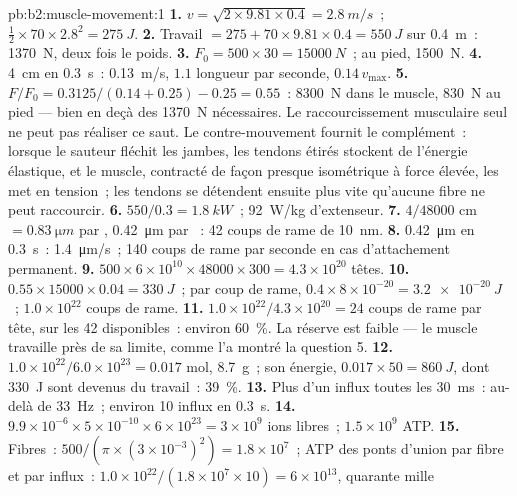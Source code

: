 \begin{solution}{pb:b2:muscle-movement:1}
\textbf{1.} $v = \sqrt{2\times 9.81\times 0.4} = \qty{2.8}{m/s}$~;
$\tfrac12\times 70\times 2.8^{2} = \qty{275}{J}$.
\textbf{2.} Travail $= 275 + 70\times 9.81\times 0.4 = \qty{550}{J}$ sur
\qty{0.4}{m}~: \qty{1370}{N}, deux fois le poids.
\textbf{3.} $F_0 = 500\times 30 = \qty{15000}{N}$~; au pied,
\qty{1500}{N}.
\textbf{4.} \qty{4}{cm} en \qty{0.3}{s}~: \qty{0.13}{m/s}, $1.1$ longueur
par seconde, $0.14\,v_{\max}$.
\textbf{5.} $F/F_0 = 0.3125/(0.14 + 0.25) - 0.25 = 0.55$~: \qty{8300}{N}
dans le muscle, \qty{830}{N} au pied --- bien en deçà des
\qty{1370}{N} nécessaires. Le raccourcissement musculaire seul ne peut
pas réaliser ce saut. Le contre-mouvement fournit le complément~: lorsque
le sauteur fléchit les jambes, les tendons étirés stockent de l'énergie
élastique, et le muscle, contracté de façon presque isométrique à force
élevée, les met en tension~; les tendons se détendent ensuite plus vite
qu'aucune fibre ne peut raccourcir.
\textbf{6.} $550/0.3 = \qty{1.8}{kW}$~; \qty{92}{W/kg} d'extenseur.
\textbf{7.} $4/\num{48000}$ cm $= \qty{0.83}{\micro m}$ par ,
\qty{0.42}{\micro m} par ~: 42 coups de rame de \qty{10}{nm}.
\textbf{8.} \qty{0.42}{\micro m} en \qty{0.3}{s}~: \qty{1.4}{\micro m/s}~;
140 coups de rame par seconde en cas d'attachement permanent.
\textbf{9.} $500\times 6\times 10^{10}\times \num{48000}\times 300 =
4.3\times 10^{20}$ têtes.
\textbf{10.} $0.55\times \num{15000}\times 0.04 = \qty{330}{J}$~; par
coup de rame, $0.4\times 8\times 10^{-20} = \qty{3.2e-20}{J}$~; $1.0\times
10^{22}$ coups de rame.
\textbf{11.} $1.0\times 10^{22}/4.3\times 10^{20} = 24$ coups de rame par
tête, sur les 42 disponibles~: environ \qty{60}{\%}. La réserve est
faible --- le muscle travaille près de sa limite, comme l'a montré la
question 5.
\textbf{12.} $1.0\times 10^{22}/6.0\times 10^{23} = 0.017$ mol,
\qty{8.7}{g}~; son énergie, $0.017\times 50 = \qty{860}{J}$, dont
\qty{330}{J} sont devenus du travail~: \qty{39}{\%}.
\textbf{13.} Plus d'un influx toutes les \qty{30}{ms}~: au-delà de
\qty{33}{Hz}~; environ 10 influx en \qty{0.3}{s}.
\textbf{14.} $9.9\times 10^{-6}\times 5\times 10^{-10}\times 6\times
10^{23} = 3\times 10^{9}$ ions libres~; $1.5\times 10^{9}$ ATP.
\textbf{15.} Fibres~: $500/(\pi\times(3\times 10^{-3})^{2}) = 1.8\times
10^{7}$~; ATP des ponts d'union par fibre et par influx~: $1.0\times
10^{22}/(1.8\times 10^{7}\times 10) = 6\times 10^{13}$, quarante mille

\end{solution}
